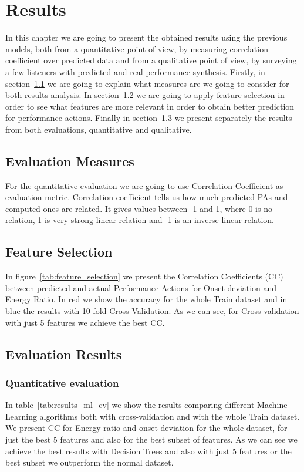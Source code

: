 \chapter{Results}
\label{chap:results}
In this chapter we are going to present the obtained results using the previous models, both from a quantitative point of view, by measuring correlation coefficient over predicted data and from a qualitative point of view, by surveying a few listeners with predicted and real performance synthesis. Firstly, in section~\ref{sec:ev_measures} we are going to explain what measures are we going to consider for both results analysis. In section~\ref{sec:features} we are going to apply feature selection in order to see what features are more relevant in order to obtain better prediction for performance actions. Finally in section~\ref{sec:ev_results} we present separately the results from both evaluations, quantitative and qualitative.

\section{Evaluation Measures}
\label{sec:ev_measures}
For the quantitative evaluation we are going to use Correlation Coefficient as evaluation metric.
Correlation coefficient tells us how much predicted PAs and computed ones are related. It gives values between -1 and 1, where 0 is no relation, 1 is very strong linear relation and -1 is an inverse linear relation.

\section{Feature Selection}
\label{sec:features}
In figure~\ref{tab:feature_selection} we present the Correlation Coefficients (CC) between predicted and actual Performance Actions for Onset deviation and Energy Ratio. In red we show the accuracy for the whole Train dataset and in blue the results with 10 fold Cross-Validation. As we can see, for Cross-validation with just 5 features we achieve the best CC.





\section{Evaluation Results}
\label{sec:ev_results}

\subsection{Quantitative evaluation}
In table~\ref{tab:results_ml_cv} we show the results comparing different Machine Learning algorithms both with cross-validation and with the whole Train dataset. We present CC for Energy ratio and onset deviation for the whole dataset, for just the best 5 features and also for the best subset of features. As we can see we achieve the best results with Decision Trees and also with just 5 features or the best subset we outperform the normal dataset.

